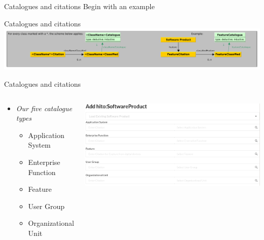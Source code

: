\documentclass[aspectratio=1610,12pt]{beamer}
\begin{document}
\begin{frame}{Catalogues and citations}
\centering
Begin with an example
\end{frame}

\begin{frame}{Catalogues and citations}
\centering
\includegraphics[width=\textwidth]{img/excerpt1.pdf}
\end{frame}

\begin{frame}{Catalogues and citations}
\begin{columns}
  \vspace{-1cm}
  \begin{spacing}{1.25}
    \begin{itemize}
      \item \emph{Our five catalogue types}
      \begin{itemize}
        \item Application System
        \item Enterprise Function
        \item Feature
        \item User Group
        \item Organizational Unit
      \end{itemize}
    \end{itemize}
  \end{spacing}
  \centering
  \includegraphics[width=\textwidth]{img/iglook.png}
\end{columns}
\end{frame}
\end{document}
